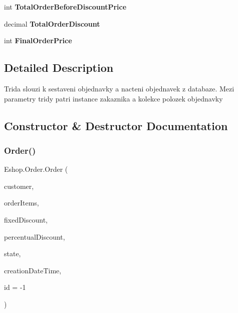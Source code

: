 \begin{DoxyCompactItemize}
int {\bfseries Total\+Order\+Before\+Discount\+Price}
\item 
\mbox{\label{class_eshop_1_1_order_a15229f62e5fd0d06511f35aa1d166575}} 
decimal {\bfseries Total\+Order\+Discount}
\item 
\mbox{\label{class_eshop_1_1_order_a2d0988982ee355f3baff758f63d0a4c2}} 
int {\bfseries Final\+Order\+Price}
\end{DoxyCompactItemize}


\subsection{Detailed Description}
Trida slouzi k sestaveni objednavky a nacteni objednavek z databaze. Mezi parametry tridy patri instance zakaznika a kolekce polozek objednavky 



\subsection{Constructor \& Destructor Documentation}
\mbox{\label{class_eshop_1_1_order_a7521c71e22f3d753e91f5fbfe53eee20}} 
\subsubsection{\texorpdfstring{Order()}{Order()}}
{\footnotesize\ttfamily Eshop.\+Order.\+Order (\begin{DoxyParamCaption}\item[{\mbox{\hyperlink{class_eshop_1_1_customer}{Customer}}}]{customer,  }\item[{List$<$ \mbox{\hyperlink{class_eshop_1_1_order_item}{Order\+Item}} $>$}]{order\+Items,  }\item[{int}]{fixed\+Discount,  }\item[{int}]{percentual\+Discount,  }\item[{int}]{state,  }\item[{Date\+Time}]{creation\+Date\+Time,  }\item[{int}]{id = {\ttfamily -\/1} }\end{DoxyParamCaption})}



